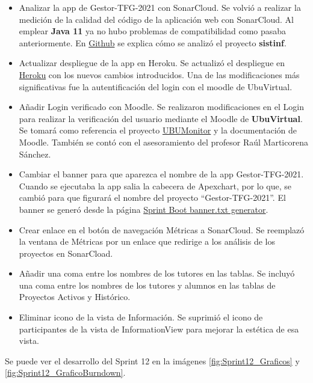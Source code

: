 \begin{itemize}
	\item Analizar la app de Gestor-TFG-2021 con SonarCloud. 
		Se volvió a realizar la medición de la calidad del código de la aplicación web con SonarCloud. Al emplear \textbf{Java 11} ya no hubo problemas de compatibilidad como pasaba anteriormente. En \href{https://github.com/dbo1001/Gestor-TFG-2021/issues/142}{Github} se explica cómo se analizó el proyecto \textbf{sistinf}.
	\item Actualizar despliegue de la app en Heroku.
		Se actualizó el despliegue en \href{https://gestor-tfg-2021.herokuapp.com/}{Heroku} con los nuevos cambios introducidos. Una de las modificaciones más significativas fue la autentificación del login con el moodle de UbuVirtual.
	\item Añadir Login verificado con Moodle. 
		Se realizaron modificaciones en el Login para realizar la verificación del usuario mediante el Moodle de \textbf{UbuVirtual}. Se tomará como referencia el proyecto \href{https://github.com/yjx0003/UBUMonitor}{UBUMonitor} y la documentación de Moodle. También se contó con el asesoramiento del profesor Raúl Marticorena Sánchez.
	\item Cambiar el banner para que aparezca el nombre de la app Gestor-TFG-2021.
		Cuando se ejecutaba la app salia la cabecera de Apexchart, por lo que, se cambió para que figurará el nombre del proyecto ``Gestor-TFG-2021''. El banner se generó desde la página \href{https://devops.datenkollektiv.de/banner.txt/index.html}{Sprint Boot banner.txt generator}.
	\item Crear enlace en el botón de navegación Métricas a SonarCloud.
		Se reemplazó la ventana de Métricas por un enlace que redirige a los análisis de los proyectos en SonarCload.
	\item Añadir una coma entre los nombres de los tutores en las tablas.
		Se incluyó una coma entre los nombres de los tutores y alumnos en las tablas de Proyectos Activos y Histórico.
	\item Eliminar icono de la vista de Información.
		Se suprimió el icono de participantes de la vista de InformationView para mejorar la estética de esa vista.
\end{itemize}

Se puede ver el desarrollo del Sprint 12 en la imágenes \ref{fig:Sprint12_Graficos} y \ref{fig:Sprint12_GraficoBurndown}.


